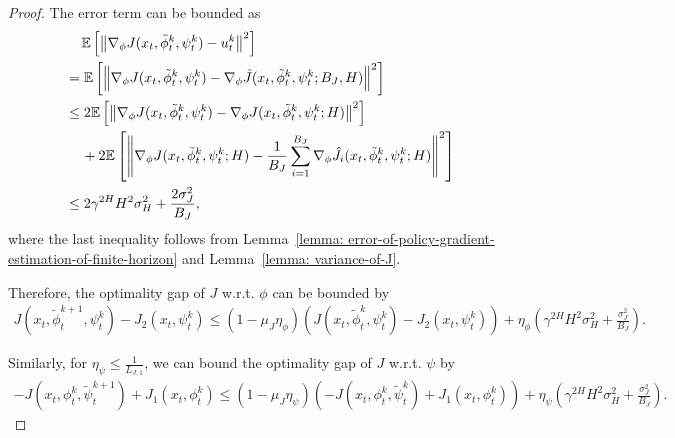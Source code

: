 \documentclass{article}
\theoremstyle{plain}
\theoremstyle{definition}
\theoremstyle{remark}
\def\E{\mathbb E}
\begin{document}
\begin{proof}
    The error term can be bounded as 
    \begin{align}
       & \quad \,  \E \left[ \left\| \nabla_\phi J(x_t,\tilde{\phi}_t^{k},\psi_t^k) - u_t^k\right\|^2 \right] \notag \\
       &  =  \E \left[ \left\| \nabla_\phi J(x_t,\tilde{\phi}_t^{k},\psi_t^k) - \nabla_\phi \hat{J}(x_t,\tilde{\phi}_t^{k},\psi_t^k;B_{J},H) \right\|^2 \right]\notag\\
        & \leq 2 \E \left[ \left\| \nabla_\phi J(x_t,\tilde{\phi}_t^{k},\psi_t^k) - \nabla_\phi J(x_t,\tilde{\phi}_t^{k},\psi_t^k;H) \right\|^2 \right]\notag \\
        & \quad \, + 2 \E \left[ \left\| \nabla_\phi J(x_t,\tilde{\phi}_t^{k},\psi_t^k;H) - \frac{1}{B_{J}} \sum_{i=1}^{B_{J}} \nabla_\phi \hat{J}_i(x_t,\tilde{\phi}_t^{k},\psi_t^k;H) \right\|^2 \right]\notag\\
        & \leq 2 \gamma^{2H} H^2 \sigma_H^2 + \frac{2\sigma_J^2}{B_{J}}, \label{eq: error-term-of-J-phi-large-batch}
    \end{align}
    where the last inequality follows from Lemma~\ref{lemma: error-of-policy-gradient-estimation-of-finite-horizon} and Lemma~\ref{lemma: variance-of-J}.
    
    Therefore, the optimality gap of $J$ w.r.t. $\phi$ can be bounded by
    \begin{align}
        J(x_t,\tilde{\phi}_t^{k+1},\psi_t^k) - J_2(x_t,\psi_t^{k})  \leq \left(1 - \mu_J \eta_\phi \right) \left(J(x_t,\tilde{\phi}_t^{k},\psi_t^k) - J_2(x_t,\psi_t^k)\right) + \eta_\phi \left( \gamma^{2H} H^2 \sigma_H^2 + \frac{\sigma_J^2}{B_{J}} \right). \label{eq: optimality-gap-of-J-phi-large-batch}
    \end{align}

    Similarly, for $\eta_\psi \leq \frac{1}{L_{J,1}}$, we can bound the optimality gap of $J$ w.r.t. $\psi$ by
    \begin{align}
         - J(x_t,\phi_t^{k},\tilde{\psi}_t^{k+1}) + J_1(x_t,\phi_t^{k}) 
         \leq \left(1 - \mu_J \eta_\psi \right) \left( - J(x_t,\phi_t^{k},\tilde{\psi}_t^{k}) + J_1(x_t,\phi_t^{k})\right) + \eta_\psi \left( \gamma^{2H} H^2 \sigma_H^2 + \frac{\sigma_J^2}{B_{J}} \right).
    \end{align}


\end{proof}
\end{document}
